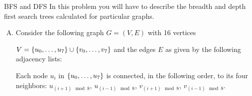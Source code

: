 \documentclass{article}
\numberwithin{table}{section}
\numberwithin{figure}{section}
\begin{document}
\newpage
\begin{section}{BFS and DFS}
In this problem you will have to describe the breadth and depth first search
trees calculated for particular graphs.

\begin{enumerate}[(A)]
    \item Consider the following graph $G = (V, E)$ with 16 vertices
    
    $V = \left\{u_0, \dots, u_7\right\} \cup \left\{v_0, \dots, v_7\right\}$ and the edges $E$ as given by the following adjacency lists:
    
    Each node ${u_i}$ in $\left\{u_0, \dots, u_7\right\}$ is connected, in the following order, to its four neighbors: $u_{(i+1) \mod 8}$, $u_{(i-1) \mod 8}$, $v_{(i+1) \mod 8}$, $v_{(i-1) \mod 8}$.
    

\end{enumerate}
\end{section}
\end{document}
